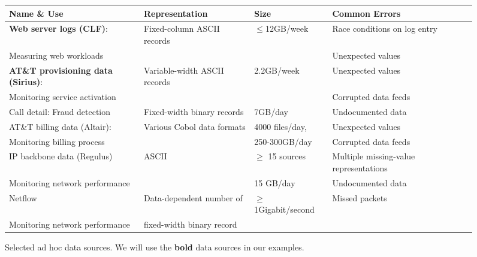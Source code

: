 \documentclass[times]{acm-sigplan}
\newcommand{\dibbler}{Sirius}
\newcommand{\ningaui}{Altair}
\newcommand{\darkstar}{Regulus}
\begin{document}
\begin{figure*}
\begin{center}
\begin{tabular}{|l|l|l|l|l|}
\hline
Name \& Use   &  Representation              &Size           & Common Errors \\ \hline\hline
\textbf{Web server logs (CLF)}: &  Fixed-column ASCII records & $\leq$12GB/week & Race conditions on log entry\\ 
Measuring web workloads                   &                             &                             & Unexpected values\\ \hline
\textbf{AT\&T provisioning data (\dibbler{})}: & Variable-width ASCII records & 2.2GB/week & Unexpected values \\ 
Monitoring service activation &                              &            & Corrupted data feeds \\ \hline
Call detail: Fraud detection  &  Fixed-width binary records  &\appr{}7GB/day &  Undocumented data\\  \hline 
AT\&T billing data (\ningaui{}): & Various Cobol data formats  & \appr{}4000 files/day, & Unexpected values\\ 
Monitoring billing process   &                             & 250-300GB/day    & Corrupted data feeds \\ \hline
IP backbone data (\darkstar{})  & ASCII  & $\ge$ 15 sources  & Multiple missing-value representations \\
Monitoring network performance  &        & \appr{}15 GB/day              & Undocumented data \\ \hline
Netflow       & Data-dependent number of     & $\ge$1Gigabit/second  & Missed packets\\ 
Monitoring network performance              &  fixed-width binary record   &                       & \\ \hline

\end{tabular}
\caption{Selected ad hoc data sources.  We will use the \textbf{bold} data sources in our examples. }
\label{figure:data-sources}
\end{center}
\end{figure*}
\end{document}
